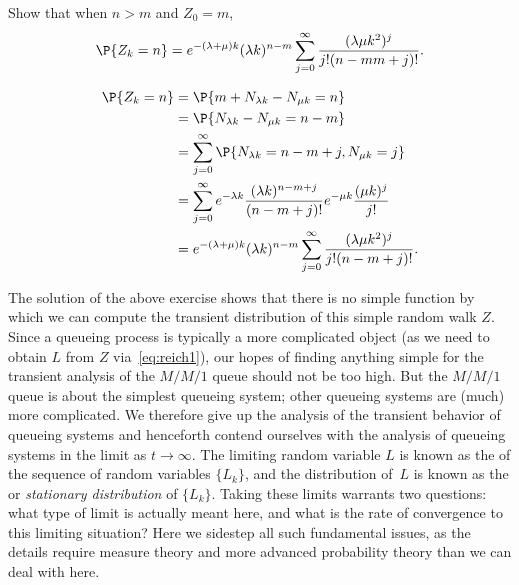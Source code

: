 \begin{exercise}
 Show that when $n>m$ and $Z_0=m$, 
\begin{equation*}
 \P{Z_k=n}
= e^{-(\lambda+\mu)k} (\lambda k)^{n-m} \sum_{j=0}^\infty 
\frac{(\lambda\mu k^2)^j} {j!(n-mm+j)!}.
\end{equation*}
\begin{solution}
\begin{equation}\label{eq:29}
 \begin{split}
 \P{Z_k=n}
&= \P{m+N_{\lambda k } - N_{\mu k} = n } \\ 
&= \P{N_{\lambda k}  - N_{\mu k}  = n - m } \\
&= \sum_{j=0}^\infty \P{N_{\lambda k}  =  n - m + j, N_{\mu k} =j}\\
&= \sum_{j=0}^\infty e^{-\lambda k} \frac{(\lambda k )^{n - m + j}}{(n-m+j)!} e^{-\mu k} \frac{(\mu k )^j}{j!} \\
&= e^{-(\lambda+\mu)k} (\lambda k)^{n-m} \sum_{j=0}^\infty  \frac{(\lambda\mu k^2)^j} {j!(n-m+j)!}.
 \end{split}
\end{equation}
\end{solution}
\end{exercise}


The solution of the above exercise shows that there is no simple function by which we can compute the transient distribution of this simple random walk $Z$.
Since a queueing process is typically a more complicated object (as we need to obtain $L$ from $Z$ via~\cref{eq:reich1}), our hopes of finding anything simple for the transient analysis of the $M/M/1$ queue should not be too high.
But the $M/M/1$ queue is about the simplest queueing system; other queueing systems are (much) more complicated.
We therefore give up the analysis of the transient behavior of queueing systems and henceforth contend ourselves with the analysis of queueing systems in the limit as $t\to\infty$.
The limiting random variable $L$ is known as the  of the sequence of random variables $\{L_k\}$, and the distribution of~$L$ is known as the  or \emph{stationary distribution} of $\{L_k\}$.
Taking these limits warrants two questions: what type of limit is actually meant here, and what is the rate of convergence to this limiting situation?
Here we sidestep all such fundamental issues, as the details require measure theory and more advanced probability theory than we can deal with here.


